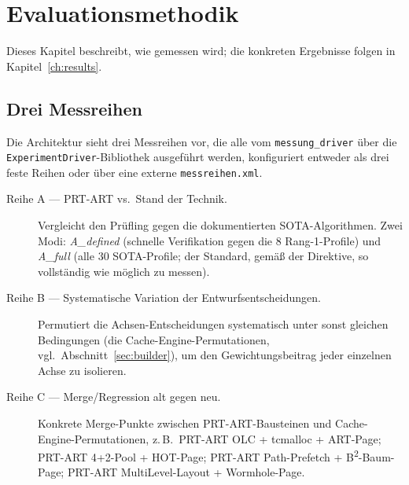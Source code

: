 \chapter{Evaluationsmethodik}\label{ch:methodology}

Dieses Kapitel beschreibt, wie gemessen wird; die konkreten Ergebnisse folgen in
Kapitel~\ref{ch:results}.

\section{Drei Messreihen}\label{sec:series}

Die Architektur sieht drei Messreihen vor, die alle vom \texttt{messung\_\allowbreak{}driver} über
die \texttt{Experiment\allowbreak{}Driver}-Bibliothek ausgeführt werden, konfiguriert entweder als
drei feste Reihen oder über eine externe \texttt{messreihen.xml}.

\begin{description}
  \item[Reihe A --- PRT-ART vs.\ Stand der Technik.] Vergleicht den Prüfling gegen die
  dokumentierten SOTA-Algorithmen. Zwei Modi: \emph{A\_defined} (schnelle Verifikation gegen die 8
  Rang-1-Profile) und \emph{A\_full} (alle 30 SOTA-Profile; der Standard, gemäß der Direktive, so
  vollständig wie möglich zu messen).
  \item[Reihe B --- Systematische Variation der Entwurfsentscheidungen.] Permutiert die
  Achsen-Entscheidungen systematisch unter sonst gleichen Bedingungen (die Cache-Engine-Permutationen,
  vgl.\ Abschnitt~\ref{sec:builder}), um den Gewichtungsbeitrag jeder einzelnen Achse zu isolieren.
  \item[Reihe C --- Merge/Regression alt gegen neu.] Konkrete Merge-Punkte zwischen PRT-ART-Bausteinen und
  Cache-Engine-Permutationen, z.\,B.\ PRT-ART OLC + tcmalloc + ART-Page; PRT-ART 4+2-Pool +
  HOT-Page; PRT-ART Path-Prefetch + B\textsuperscript{2}-Baum-Page; PRT-ART MultiLevel-Layout +
  Wormhole-Page.
\end{description}

